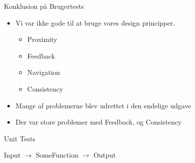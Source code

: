 \begin{frame}{Konklusion på Brugertests}
	
	
\begin{itemize}
	\item Vi var ikke gode til at bruge vores design principper.
		\begin{itemize}
			\item Proximity
			\item Feedback
			\item Navigation
			\item Consistency
		\end{itemize}
	\item Mange af problemerne blev udrettet i den endelige udgave
	\item Der var store problemer med Feedback, og Consistency
\end{itemize}
  
\end{frame}


\begin{frame}{Unit Tests}


Input $\rightarrow$ SomeFunction $\rightarrow$  Output




\end{frame}
